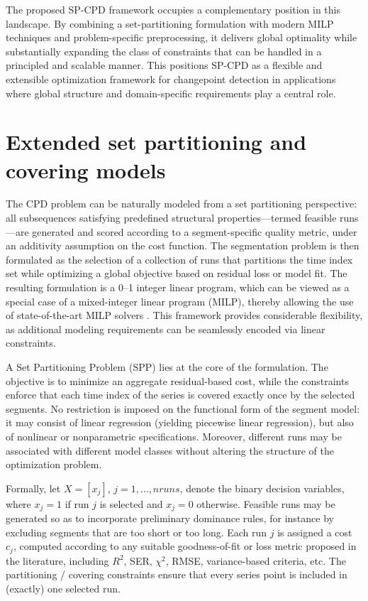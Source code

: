 \documentclass[preprints,article,submit,pdftex,moreauthors]{Definitions/mdpi}
\begin{document}
The proposed SP-CPD framework occupies a complementary position in this landscape. By combining a set-partitioning formulation with modern MILP techniques and problem-specific preprocessing, it delivers global optimality while substantially expanding the class of constraints that can be handled in a principled and scalable manner. This positions SP-CPD as a flexible and extensible optimization framework for changepoint detection in applications where global structure and domain-specific requirements play a central role.


\section{Extended set partitioning and covering models}  \label{sec:SCPmodel}
The CPD problem can be naturally modeled from a set partitioning perspective: all subsequences satisfying predefined structural properties—termed feasible runs—are generated and scored according to a segment-specific quality metric, under an additivity assumption on the cost function. The segmentation problem is then formulated as the selection of a collection of runs that partitions the time index set while optimizing a global objective based on residual loss or model fit. The resulting formulation is a 0–1 integer linear program, which can be viewed as a special case of a mixed-integer linear program (MILP), thereby allowing the use of state-of-the-art MILP solvers \cite{FLS09}. This framework provides considerable flexibility, as additional modeling requirements can be seamlessly encoded via linear constraints.

A Set Partitioning Problem (SPP) lies at the core of the formulation. The objective is to minimize an aggregate residual-based cost, while the constraints enforce that each time index of the series is covered exactly once by the selected segments. No restriction is imposed on the functional form of the segment model: it may consist of linear regression (yielding piecewise linear regression), but also of nonlinear or nonparametric specifications. Moreover, different runs may be associated with different model classes without altering the structure of the optimization problem.

Formally, let $X = [x_j]$, $j = 1,\ldots,nruns$, denote the binary decision variables, where $x_j = 1$ if run $j$ is selected and $x_j = 0$ otherwise. Feasible runs may be generated so as to incorporate preliminary dominance rules, for instance by excluding segments that are too short or too long. Each run $j$ is assigned a cost $c_j$, computed according to any suitable goodness-of-fit or loss metric proposed in the literature, including $R^2$, SER, $\chi^2$, RMSE, variance-based criteria, etc. The partitioning / covering constraints ensure that every series point is included in (exactly) one selected run.
\end{document}

